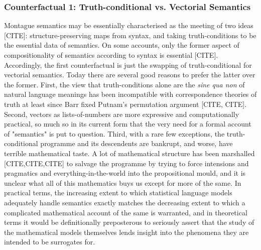 \subsubsection{Counterfactual 1: Truth-conditional vs. Vectorial Semantics}

Montague semantics may be essentially characterised as the meeting of two ideas [CITE]: structure-preserving maps from syntax, and taking truth-conditions to be the essential data of semantics. On some accounts, only the former aspect of compositionality of semantics according to syntax is essential [CITE]. Accordingly, the first counterfactual is just the swapping of truth-conditional for vectorial semantics. Today there are several good reasons to prefer the latter over the former. First, the view that truth-conditions alone are the \emph{sine qua non} of natural language meanings has been incompatible with correspondence theories of truth at least since Barr fixed Putnam's permutation argument [CITE, CITE]. Second, vectors as lists-of-numbers are more expressive and computationally practical, so much so in its current form that the very need for a formal account of "semantics" is put to question. Third, with a rare few exceptions, the truth-conditional programme and its descendents are bankrupt, and worse, have terrible mathematical taste. A lot of mathematical structure has been marshalled [CITE,CITE,CITE] to salvage the programme by trying to force intensions and pragmatics and everything-in-the-world into the propositional mould, and it is unclear what all of this mathematics buys us except for more of the same. In practical terms, the increasing extent to which statistical language models adequately handle semantics exactly matches the decreasing extent to which a complicated mathematical account of the same is warranted, and in theoretical terms it would be definitionally preposterous to seriously assert that the study of the mathematical models themselves lends insight into the phenomena they are intended to be surrogates for.

